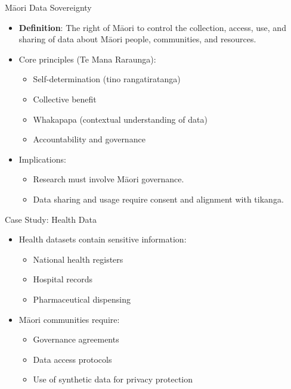 \documentclass[
  12pt,
  ignorenonframetext,
]{beamer}
\providecommand{\tightlist}{%
  \setlength{\itemsep}{0pt}\setlength{\parskip}{0pt}}\usepackage{longtable,booktabs,array}
\begin{document}
\begin{frame}{Māori Data Sovereignty}
\label{mux101ori-data-sovereignty}
\begin{itemize}
\tightlist
\item
  \textbf{Definition}: The right of Māori to control the collection,
  access, use, and sharing of data about Māori people, communities, and
  resources.
\item
  Core principles (Te Mana Raraunga):

  \begin{itemize}
  \tightlist
  \item
    Self-determination (tino rangatiratanga)
  \item
    Collective benefit
  \item
    Whakapapa (contextual understanding of data)
  \item
    Accountability and governance
  \end{itemize}
\item
  Implications:

  \begin{itemize}
  \tightlist
  \item
    Research must involve Māori governance.
  \item
    Data sharing and usage require consent and alignment with tikanga.
  \end{itemize}
\end{itemize}
\end{frame}

\begin{frame}{Case Study: Health Data}
\label{case-study-health-data}
\begin{itemize}
\tightlist
\item
  Health datasets contain sensitive information:

  \begin{itemize}
  \tightlist
  \item
    National health registers
  \item
    Hospital records
  \item
    Pharmaceutical dispensing
  \end{itemize}
\item
  Māori communities require:

  \begin{itemize}
  \tightlist
  \item
    Governance agreements
  \item
    Data access protocols
  \item
    Use of synthetic data for privacy protection
  \end{itemize}
\end{itemize}
\end{frame}
\end{document}
